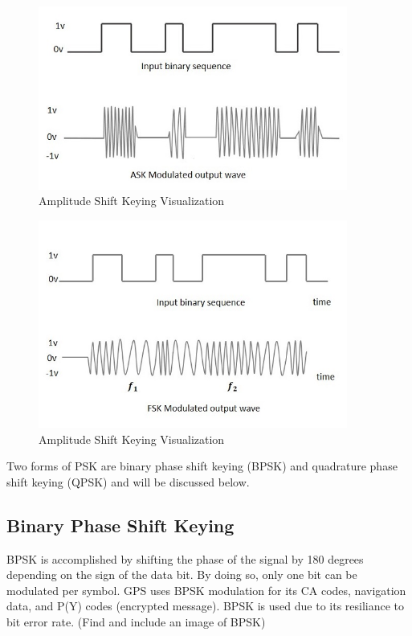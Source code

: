 \documentclass[12pt]{report}
\begin{document}
\begin{figure}[h]

    \centering
    \includegraphics[width=4.0in]{ask_modulated_waveform.jpg}
    \caption{Amplitude Shift Keying Visualization \cite{AmplitudeShiftKeying} }
    \label{fig:ASKsig}

\end{figure}

\begin{figure}[h]

    \centering
    \includegraphics[width=4.0in]{fsk_modulated_output_wave.jpg}
    \caption{Amplitude Shift Keying Visualization \cite{FrequencyShiftKeying} }
    \label{fig:FSKsig}

\end{figure}

Two forms of PSK are binary phase shift keying (BPSK) and quadrature phase shift keying (QPSK) and will be discussed below.

\subsection{Binary Phase Shift Keying}

BPSK is accomplished by shifting the phase of the signal by 180 degrees depending on the sign of the data bit. By doing so, only one bit can be modulated per symbol. GPS uses BPSK modulation for its CA codes, navigation data, and P(Y) codes (encrypted message). BPSK is used due to its resiliance to bit error rate.
(Find and include an image of BPSK)  
\end{document}
